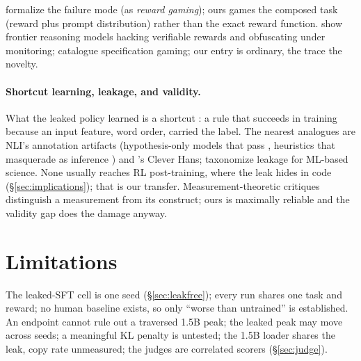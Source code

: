 \documentclass{article}
\begin{document}
\citet{skalse2022} formalize the failure mode (as \emph{reward gaming}); ours games the composed task (reward plus prompt distribution) rather than the exact reward function. \citet{baker2025monitoring} show frontier reasoning models hacking verifiable rewards and obfuscating under monitoring; \citet{krakovna2020specification} catalogue specification gaming; our entry is ordinary, the trace the novelty.

\paragraph{Shortcut learning, leakage, and validity.} What the leaked policy learned is a shortcut \citep{geirhos2020shortcut}: a rule that succeeds in training because an input feature, word order, carried the label. The nearest analogues are NLI's annotation artifacts (hypothesis-only models that pass \citep{gururangan2018, poliak2018}, heuristics that masquerade as inference \citep{mccoy2019}) and \citet{lapuschkin2019unmasking}'s Clever Hans; \citet{kapoor2023} taxonomize leakage for ML-based science. None usually reaches RL post-training, where the leak hides in code (\S\ref{sec:implications}); that is our transfer. Measurement-theoretic critiques \citep{jacobs2021, freiesleben2025, chehbouni2025, manheim2018categorizing} distinguish a measurement from its construct; ours is maximally reliable and the validity gap does the damage anyway.

\section{Limitations}
\label{sec:limitations}

The leaked-SFT cell is one seed (\S\ref{sec:leakfree}); every run shares one task and reward; no human baseline exists, so only ``worse than untrained'' is established. An endpoint cannot rule out a traversed 1.5B peak; the leaked peak may move across seeds; a meaningful KL penalty is untested; the 1.5B loader shares the leak, copy rate unmeasured; the judges are correlated scorers (\S\ref{sec:judge}).




\end{document}
